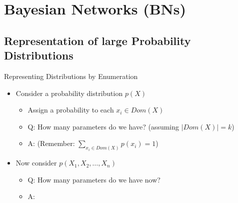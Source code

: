 \section{Bayesian Networks (BNs)}

\subsection{Representation of large Probability Distributions}

\begin{frame}{Representing Distributions by Enumeration}{}
	\begin{itemize}
		\item Consider a probability distribution $p(X)$
		\begin{itemize}
			\item Assign a probability to each $x_i \in Dom(X)$
			\item Q: How many parameters do we have? (assuming $\vert Dom(X) \vert = k$)
			\item A:  (Remember: $\sum_{x_i \in Dom(X)} p(x_i) = 1$)
		\end{itemize}
		\item Now consider $p(X_1, X_2, \dots, X_n)$
		\begin{itemize}
			\item Q: How many parameters do we have now?
			\item A:  
		\end{itemize}
	\end{itemize}

	\vspace*{2mm}
	\begin{boxBlueNoFrame}
	\end{boxBlueNoFrame}
\end{frame}


